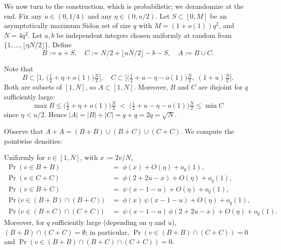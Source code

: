 \documentclass[11pt]{amsart}
\begin{document}
We now turn to the construction, which is probabilistic; we derandomize at the end.
Fix any $u \in (0, 1/4)$ and any $\eta \in (0, u/2)$.
Let $S \subset [0,M]$ be an asymptotically maximum Sidon set of size $q$ with $M = (1 + o(1))q^2$, and $N = 4q^2$. Let $a,b$ be independent integers chosen uniformly at random from $\{1, \ldots, \lfloor \eta N/2 \rfloor\}$. Define
\[
   B := a + S, \quad C := N/2 + \lfloor uN/2 \rfloor - b - S, \quad A := B \cup C.
\]
\begin{observation}\label{obs:A-size}
   Note that
   \[
   B \subset \bigl[1,\,\bigl(\tfrac{1}{2}+\eta+o(1)\bigr)\tfrac{N}{2}\bigr], \quad
   C \subset \bigl[\bigl(\tfrac{1}{2}+u-\eta-o(1)\bigr)\tfrac{N}{2},\;(1+u)\tfrac{N}{2}\bigr].
   \]
   Both are subsets of $[1,N]$, so $A \subset [1,N]$. Moreover, $B$ and $C$ are disjoint for $q$ sufficiently large:
   \begin{equation}\label{eq:max-B-min-C}
   \max B \leq \bigl(\tfrac{1}{2}+\eta+o(1)\bigr)\tfrac{N}{2} \;<\; \bigl(\tfrac{1}{2}+u-\eta-o(1)\bigr)\tfrac{N}{2} \leq \min C
   \end{equation}
   since $\eta < u/2$. Hence $|A| = |B|+|C| = q + q = 2q = \sqrt{N}$.
\end{observation}
Observe that $A + A = (B + B) \cup (B + C) \cup (C + C)$. We compute the pointwise densities:
\begin{lemma}\label{lem:point-densities}
Uniformly for $v\in[1,N]$, with $x:=2v/N$,
\begin{align}
\Pr(v\in B+B) &\;=\;\phi(x)+O(\eta)+o_q(1),\label{eq:density-BB}\\
\Pr(v\in C+C) &\;=\;\phi(2+2u-x)+O(\eta)+o_q(1),\label{eq:density-CC}\\
\Pr(v\in B+C) &\;=\;\psi(x-1-u)+O(\eta)+o_q(1),\label{eq:density-BC}\\
\Pr\bigl(v\in(B+B)\cap(B+C)\bigr) &\;=\;\phi(x)\,\psi(x-1-u)+O(\eta)+o_q(1),\label{eq:density-BB-BC}\\
\Pr\bigl(v\in(B+C)\cap(C+C)\bigr) &\;=\;\psi(x-1-u)\,\phi(2+2u-x)+O(\eta)+o_q(1).\label{eq:density-BC-CC}
\end{align}
Moreover, for $q$ sufficiently large (depending on $\eta$ and $u$), $(B+B) \cap (C+C) = \emptyset$; in particular, $\Pr(v\in(B+B)\cap(C+C)) = 0$ and $\Pr(v\in(B+B)\cap(B+C)\cap(C+C)) = 0$.
\end{lemma}
\end{document}
